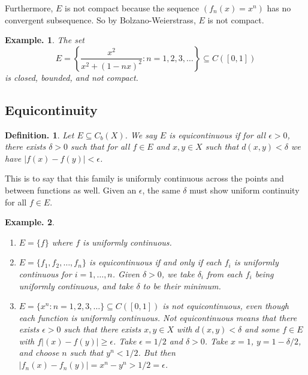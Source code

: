 \documentclass[11pt, a4paper]{memoir}
\theoremstyle{change}
\theoremstyle{plain}
\theoremstyle{nonumberplain}
\newtheorem{definition}{Definition.}
\newtheorem{example}{Example.}
\numberwithin{equation}{section}
\begin{document}
Furthermore, $E$ is not compact because the sequence $(f_n(x)=x^n)$ has no convergent subsequence.
So by Bolzano-Weierstrass, $E$ is not compact.
\begin{example}
    The set
    \[E=\left\{\frac{x^2}{x^2+(1-nx)^2}:n=1,2,3,\ldots\right\}\subseteq C([0,1])\]
    is closed, bounded, and not compact.
\end{example}
\subsection{Equicontinuity}
\begin{definition}
    Let $E\subseteq C_b(X)$.
    We say $E$ is equicontinuous if for all $\epsilon>0$, there exists $\delta>0$ such that for all $f\in E$
    and $x,y\in X$ such that $d(x,y)<\delta$ we have $|f(x)-f(y)|<\epsilon$.
\end{definition}
This is to say that this family is uniformly continuous across the points and between functions as well.
Given an $\epsilon$, the same $\delta$ must show uniform continuity for all $f\in E$.
\begin{example}
    \begin{enumerate}
        \item $E=\{f\}$ where $f$ is uniformly continuous.
        \item $E=\{f_1,f_2,\ldots,f_n\}$ is equicontinuous if and only if each $f_i$ is uniformly continuous for $i=1,\ldots,n$.
            Given $\delta>0$, we take $\delta_i$ from each $f_i$ being uniformly continuous, and take $\delta$ to be their minimum.
        \item $E=\{x^n:n=1,2,3,\ldots\}\subseteq C([0,1])$ is not equicontinuous, even though each function is uniformly continuous.
            Not equicontinuous means that there exists $\epsilon>0$ such that there exists $x,y\in X$ with $d(x,y)<\delta$
            and some $f\in E$ with $f|(x)-f(y)|\geq\epsilon$. Take $\epsilon=1/2$ and $\delta>0$. Take $x=1$, $y=1-\delta/2$,
            and choose $n$ such that $y^n<1/2$. But then $|f_n(x)-f_n(y)|=x^n-y^n>1/2=\epsilon$.
    \end{enumerate}
\end{example}
\end{document}
